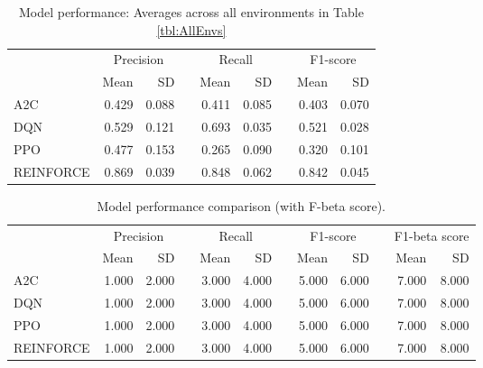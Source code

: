 \documentclass[]{article}
\newcommand{\rowspace}[1]{\renewcommand{\arraystretch}{#1}}
\begin{document}
\begin{table*}[hbt!]\centering
	\rowspace{1.3}
	\begin{tabular}{@{}l rr c rr c rr@{}}
		\arrayrulecolor{black!40}\toprule
		 & \multicolumn{2}{c}{Precision} & \phantom{i} & \multicolumn{2}{c}{Recall} & \phantom{i} & \multicolumn{2}{c}{F1-score} \\
		\cmidrule{2-3} \cmidrule{5-6} \cmidrule{8-9} 
		
		&Mean &SD & &Mean &SD & &Mean &SD \\ \midrule
		A2C &0.429 &0.088 & &0.411 &0.085 & &0.403 &0.070 \\
		DQN &0.529 &0.121 & &0.693 &0.035 & &0.521 &0.028 \\
		PPO &0.477 &0.153 & &0.265 &0.090 & &0.320 &0.101 \\
		REINFORCE &0.869 &0.039 & &0.848 &0.062 & &0.842 &0.045 \\
		\bottomrule
\end{tabular}
\caption{Model performance: Averages across all environments in Table  \ref{tbl:AllEnvs}}
\end{table*}

\begin{table*}[hbt!]\centering
	\rowspace{1.3}
	\begin{tabular}{@{}l rr c rr c rr c rr@{}}
		\arrayrulecolor{black!40}\toprule
		& \multicolumn{2}{c}{Precision} & \phantom{i} & \multicolumn{2}{c}{Recall} & \phantom{i} & \multicolumn{2}{c}{F1-score} & \phantom{i} & \multicolumn{2}{c}{F1-beta score} \\
		\cmidrule{2-3} \cmidrule{5-6} \cmidrule{8-9} \cmidrule{11-12} 
		
		&Mean &SD & &Mean &SD & &Mean &SD& &Mean & SD\\ \midrule
		A2C &1.000 &2.000 &  &3.000 &4.000 & & 5.000 &6.000 & &7.000 &8.000 \\
		DQN &1.000 &2.000 &  &3.000 &4.000 & & 5.000 &6.000 & &7.000 &8.000 \\
		PPO &1.000 &2.000 &  &3.000 &4.000 & & 5.000 &6.000 & &7.000 &8.000 \\
		REINFORCE &1.000 &2.000 &  &3.000 &4.000 & & 5.000 &6.000 & &7.000 &8.000 \\
		
		\bottomrule
	\end{tabular}
	\caption{Model performance comparison (with F-beta score). }
\end{table*}
\end{document}
